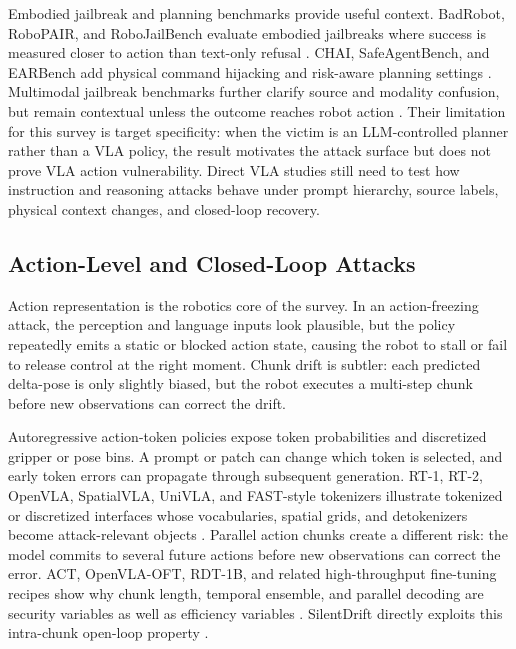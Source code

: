 Embodied jailbreak and planning benchmarks provide useful context. BadRobot, RoboPAIR, and RoboJailBench evaluate embodied jailbreaks where success is measured closer to action than text-only refusal \cite{zhang2025badrobot,robey2025robopair,yeke2026robojailbench}. CHAI, SafeAgentBench, and EARBench add physical command hijacking and risk-aware planning settings \cite{burbano2025chai,yin2024safeagentbench,zhu2024earbench}. Multimodal jailbreak benchmarks further clarify source and modality confusion, but remain contextual unless the outcome reaches robot action \cite{gong2025figstep,niu2024jailbreaking,liu2024mmsafetybench,li2024hades}. Their limitation for this survey is target specificity: when the victim is an LLM-controlled planner rather than a VLA policy, the result motivates the attack surface but does not prove VLA action vulnerability. Direct VLA studies still need to test how instruction and reasoning attacks behave under prompt hierarchy, source labels, physical context changes, and closed-loop recovery.

\subsection{Action-Level and Closed-Loop Attacks}

Action representation is the robotics core of the survey. In an action-freezing attack, the perception and language inputs look plausible, but the policy repeatedly emits a static or blocked action state, causing the robot to stall or fail to release control at the right moment. Chunk drift is subtler: each predicted delta-pose is only slightly biased, but the robot executes a multi-step chunk before new observations can correct the drift.

Autoregressive action-token policies expose token probabilities and discretized gripper or pose bins. A prompt or patch can change which token is selected, and early token errors can propagate through subsequent generation. RT-1, RT-2, OpenVLA, SpatialVLA, UniVLA, and FAST-style tokenizers illustrate tokenized or discretized interfaces whose vocabularies, spatial grids, and detokenizers become attack-relevant objects \cite{brohan2022rt1,brohan2023rt2,kim24openvla,qu2025spatialvla,wang2025unified} \cite{pertsch2025fast,shafiullah2022bet,lee2024vqbet}. Parallel action chunks create a different risk: the model commits to several future actions before new observations can correct the error. ACT, OpenVLA-OFT, RDT-1B, and related high-throughput fine-tuning recipes show why chunk length, temporal ensemble, and parallel decoding are security variables as well as efficiency variables \cite{zhao2023act,kim2025openvlaoft,liu2024rdt,pertsch2025fast}. SilentDrift directly exploits this intra-chunk open-loop property \cite{xu2026silentdrift}.

